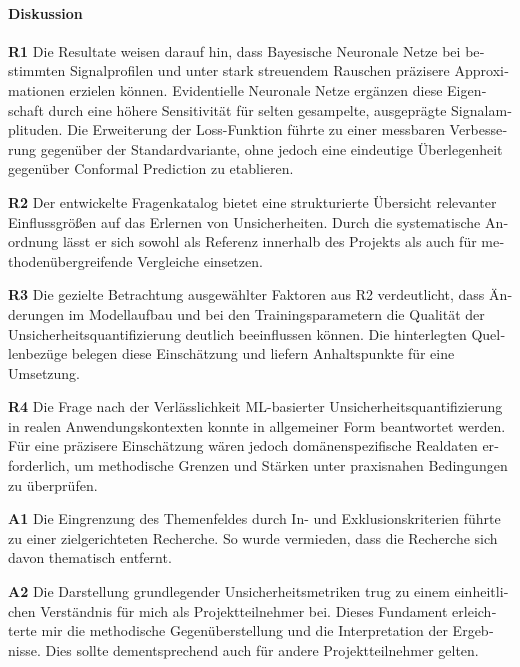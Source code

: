 \begin{otherlanguage}{ngerman}




\paragraph{Diskussion} 

\newline

\textbf{R1} Die Resultate weisen darauf hin, dass Bayesische Neuronale Netze bei bestimmten Signalprofilen und unter stark streuendem Rauschen präzisere Approximationen erzielen können. Evidentielle Neuronale Netze ergänzen diese Eigenschaft durch eine höhere Sensitivität für selten gesampelte, ausgeprägte Signalamplituden. Die Erweiterung der Loss-Funktion führte zu einer messbaren Verbesserung gegenüber der Standardvariante, ohne jedoch eine eindeutige Überlegenheit gegenüber Conformal Prediction zu etablieren.

\textbf{R2} Der entwickelte Fragenkatalog bietet eine strukturierte Übersicht relevanter Einflussgrößen auf das Erlernen von Unsicherheiten. Durch die systematische Anordnung lässt er sich sowohl als Referenz innerhalb des Projekts als auch für methodenübergreifende Vergleiche einsetzen.

\textbf{R3} Die gezielte Betrachtung ausgewählter Faktoren aus R2 verdeutlicht, dass Änderungen im Modellaufbau und bei den Trainingsparametern die Qualität der Unsicherheitsquantifizierung deutlich beeinflussen können. Die hinterlegten Quellenbezüge belegen diese Einschätzung und liefern Anhaltspunkte für eine Umsetzung.

\textbf{R4} Die Frage nach der Verlässlichkeit ML-basierter Unsicherheitsquantifizierung in realen Anwendungskontexten konnte in allgemeiner Form beantwortet werden. Für eine präzisere Einschätzung wären jedoch domänenspezifische Realdaten erforderlich, um methodische Grenzen und Stärken unter praxisnahen Bedingungen zu überprüfen.

\textbf{A1} Die Eingrenzung des Themenfeldes durch In- und Exklusionskriterien führte zu einer zielgerichteten Recherche. So wurde vermieden, dass die Recherche sich davon thematisch entfernt.

\textbf{A2} Die Darstellung grundlegender Unsicherheitsmetriken trug zu einem einheitlichen Verständnis für mich als Projektteilnehmer bei. Dieses Fundament erleichterte mir die methodische Gegenüberstellung und die Interpretation der Ergebnisse. Dies sollte dementsprechend auch für andere Projektteilnehmer gelten.


\end{otherlanguage}
